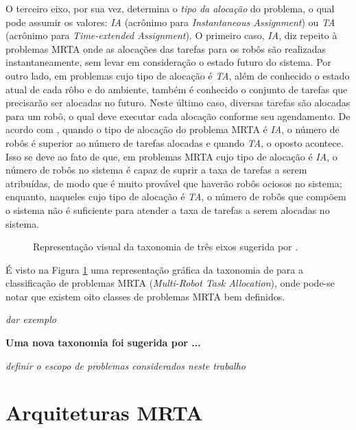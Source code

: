         O terceiro eixo, por sua vez, determina o \textit{tipo da alocação} do problema, o qual pode assumir os valores: \textit{IA} (acrônimo para \textit{Instantaneous Assignment}) ou \textit{TA} (acrônimo para \textit{Time-extended Assignment}). O primeiro caso, \textit{IA}, diz repeito à problemas MRTA onde as alocações das tarefas para os robôs são realizadas instantaneamente, sem levar em consideração o estado futuro do sistema. Por outro lado, em problemas cujo tipo de alocação é \textit{TA}, além de conhecido o estado atual de cada rôbo e do ambiente, também é conhecido o conjunto de tarefas que precisarão ser alocadas no futuro. Neste último caso, diversas tarefas são alocadas para um robô, o qual deve executar cada alocação conforme seu agendamento. De acordo com \cite{ref:bastos2008utility}, quando o tipo de alocação do problema MRTA é \textit{IA}, o número de robôs é superior ao número de tarefas alocadas e quando \textit{TA}, o oposto acontece. Isso se deve ao fato de que, em problemas MRTA cujo tipo de alocação é \textit{IA}, o número de robôs no sistema é capaz de suprir a taxa de tarefas a serem atribuídas, de modo que é muito provável que haverão robôs ociosos no sistema; enquanto, naqueles cujo tipo de alocação é \textit{TA}, o número de robôs que compõem o sistema não é suficiente para atender a taxa de tarefas a serem alocadas no sistema.
        
        \begin{figure}[htb]
            \centering
            
            \caption[Representação visual da taxonomia de três eixos]{Representação visual da taxonomia de três eixos sugerida por .} \label{fig:taxomia_mrta}
        \end{figure}
        
        É visto na Figura \ref{fig:taxomia_mrta} uma representação gráfica da taxonomia de \cite{ref:gerkey2004taxonomy} para a classificação de problemas MRTA (\textit{Multi-Robot Task Allocation}), onde pode-se notar que existem oito classes de problemas MRTA bem definidos.
        
        \emph{\color{red} dar exemplo}
        
        \textbf{\color{red} Uma nova taxonomia foi sugerida por ...}
        
        
        \emph{\color{red} definir o escopo de problemas considerados neste trabalho}
    
    \section{Arquiteturas MRTA} \label{sec:arquiteturas_mrta}
        
